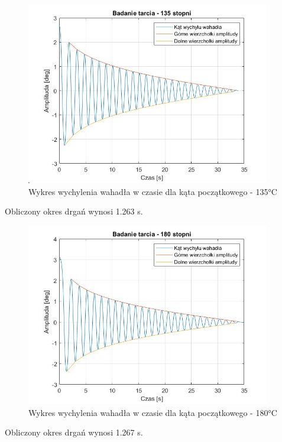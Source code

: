 \documentclass[12pt]{article}
\numberwithin{equation}{section}
\begin{document}
\begin{figure}[H]
    \centering
    \includegraphics[width=0.95\textwidth]{wahadlo135.jpg}
    \caption{Wykres wychylenia wahadła w czasie dla kąta początkowego - 135°C}
    \label{fig:wahadlo135}
\end{figure}

Obliczony okres drgań wynosi 1.263 s.

\begin{figure}[H]
    \centering
    \includegraphics[width=0.95\textwidth]{wahadlo180.jpg}
    \caption{Wykres wychylenia wahadła w czasie dla kąta początkowego - 180°C}
    \label{fig:wahadlo180}
\end{figure}

Obliczony okres drgań wynosi 1.267 s.
\end{document}
